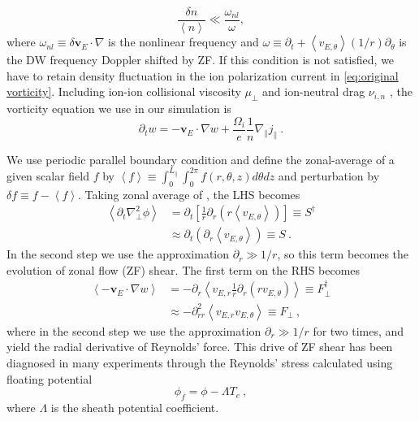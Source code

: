 \documentclass[aps,pre,twocolumn,superscriptaddress]{revtex4-2}
\begin{document}
\begin{equation}
	\frac{\delta n}{\left<n\right>}\ll\frac{\omega_{nl}}{\omega},
\end{equation}
where $\omega_{nl}\equiv\delta\bm{v}_E\cdot\nabla$ is the nonlinear frequency and $\omega\equiv\partial_{t}+\left<v_{E,\theta}\right>\left(1/r\right)\partial_{\theta}$ is the DW frequency Doppler shifted by ZF. If this condition is not satisfied, we have to retain density fluctuation in the ion polarization current in \cref{eq:original vorticity}. Including ion-ion collisional viscosity $\mu_{\perp}$ and ion-neutral drag $\nu_{i,n}$ \cite{Vaezi_2017U}, the vorticity equation we use in our simulation \cite{Lang_2019} is
\begin{equation}
	\partial_{t}w=-\bm{v}_{E}\cdot\nabla w
	+\frac{\Omega_{i}}{e}\frac{1}{n}\nabla_{\parallel}j_{\parallel}~.
\label{eq:vorticity}
\end{equation}


We use periodic parallel boundary condition and define the zonal-average of a given scalar field $f$ by $\left<f\right>\equiv\int_{0}^{L_{\parallel}}\int_{0}^{2\pi}f
\left(r,\theta,z\right)d\theta dz$ and perturbation by $\delta f\equiv f-\left<f\right>$. Taking zonal average of , the LHS becomes
\begin{equation}
\begin{aligned}
	\left<\partial_{t}\nabla_{\perp}^{2}\phi\right>
&=\partial_{t}\left[\frac{1}{r}\partial_{r}
\left(r\left<v_{E,\theta}\right>\right)\right]\equiv S^{\dagger} \\
&\approx\partial_{t}\left(\partial_{r}\left<v_{E,\theta}\right>\right)\equiv S~.
\label{eq:S}
\end{aligned}
\end{equation}
In the second step we use the approximation $\partial_{r}\gg 1/r$, so this term becomes the evolution of zonal flow (ZF) shear. The first term on the RHS becomes 
\begin{equation}
\begin{aligned}
	\left<-\bm{v}_{E}\cdot\nabla w\right>
	&=-\partial_{r}\left<v_{E,r}\frac{1}{r}\partial_{r}
	\left(rv_{E,\theta}\right)\right>\equiv F_{\perp}^{\dagger} \\
	&\approx-\partial_{rr}^{2}\left<v_{E,r}v_{E,\theta}\right>\equiv F_{\perp}~,
\label{eq:Fperp}
\end{aligned}
\end{equation}
where in the second step we use the approximation $\partial_{r}\gg 1/r$ for two times, and yield the radial derivative of Reynolds' force. This drive of ZF shear has been diagnosed in many experiments \cite{doi:10.1063/1.2985836,PhysRevLett.96.195002,PhysRevLett.104.065002} through the Reynolds' stress calculated using floating potential 
\begin{equation}
	\phi_{f}=\phi-\Lambda T_{e}~,
\label{eq:phif}
\end{equation}
where $\Lambda$ is the sheath potential coefficient.
\end{document}
